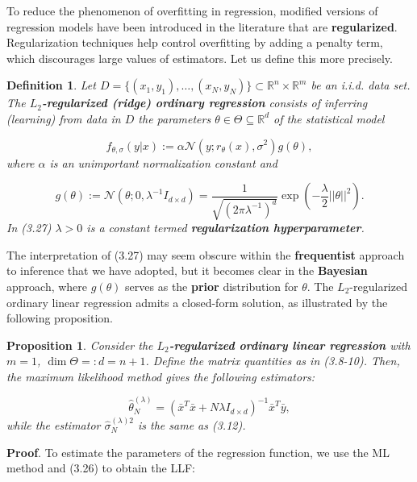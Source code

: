 \documentclass{report}
\newtheorem{definition}{Definition}[chapter]
\newtheorem{proposition}{Proposition}[chapter]
\begin{document}
To reduce the phenomenon of overfitting in regression, modified versions of regression models have been introduced in the literature that are \textbf{regularized}. Regularization techniques help control overfitting by adding a penalty term, which discourages large values of estimators. Let us define this more precisely.

\begin{definition}
Let $D = \{(x_1,y_1),\dots,(x_N,y_N)\} \subset \mathbb{R}^n \times \mathbb{R}^m$ be an i.i.d. data set. The \textbf{$L_2$-regularized (ridge) ordinary regression} consists of inferring (learning) from data in $D$ the parameters $\theta \in \Theta \subseteq \mathbb{R}^d$ of the statistical model

\begin{equation}
f_{\theta,\sigma}(y|x) := \alpha\mathcal{N}(y;r_\theta(x),\sigma^2)g(\theta),
\end{equation}
where $\alpha$ is an unimportant normalization constant and

\begin{equation}
g(\theta) := \mathcal{N}(\theta;0,\lambda^{-1}I_{d\times d}) = \frac{1}{\sqrt{(2\pi\lambda^{-1})^d}}\exp\left(-\frac{\lambda}{2}||\theta||^2\right).
\end{equation}
In (3.27) $\lambda > 0$ is a constant termed \textbf{regularization hyperparameter}.
\end{definition}
The interpretation of (3.27) may seem obscure within the \textbf{frequentist} approach to inference that we have adopted, but it becomes clear in the \textbf{Bayesian} approach, where $g(\theta)$ serves as the \textbf{prior} distribution for $\theta$. The $L_2$-regularized ordinary linear regression admits a closed-form solution, as illustrated by the following proposition.

\begin{proposition}
Consider the \textbf{$L_2$-regularized ordinary linear regression} with $m=1$, $\dim \Theta =: d = n + 1$. Define the matrix quantities as in (3.8-10). Then, the maximum likelihood method gives the following estimators:

\begin{equation}
\hat{\theta}_N^{(\lambda)} = (\bar{x}^T\bar{x} +N\lambda I_{d\times d})^{-1}\bar{x}^T\bar{y},
\end{equation}
while the estimator $\hat{\sigma}_N^{(\lambda)2}$ is the same as (3.12).
\end{proposition}
\textbf{Proof}. To estimate the parameters of the regression function, we use the ML method and (3.26) to obtain the LLF:
\end{document}
